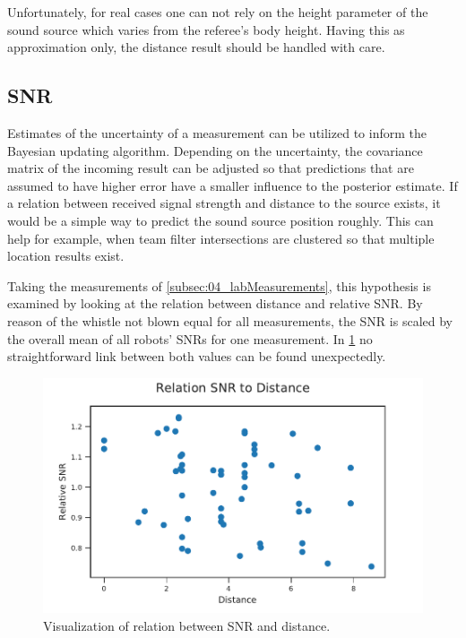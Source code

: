 Unfortunately, for real cases one can not rely on the height parameter of the sound
source which varies from the referee's body height.
Having this as approximation only, the distance result should be handled
with care.

\subsection{SNR}
\label{subsec:04_snr}

Estimates of the uncertainty of a measurement can be utilized to inform the
Bayesian updating algorithm.
Depending on the uncertainty, the covariance matrix of the incoming result can
be adjusted so that predictions that are assumed to have higher error have
a smaller influence to the posterior estimate.
If a relation between received signal strength and distance to the source exists,
it would be a simple way to predict the sound source position roughly.
This can help for example, when team filter intersections are clustered so that
multiple location results exist.

Taking the measurements of \cref{subsec:04_labMeasurements}, this hypothesis is
examined by looking at the relation between distance and relative \ac{SNR}.
By reason of the whistle not blown equal for all measurements,
the \ac{SNR} is scaled by the overall mean of all robots' \acp{SNR} for one
measurement.
In \cref{fig:04_snrDistance} no straightforward
link between both values can be found unexpectedly.
\begin{figure}[ht]
	\centering
	\includegraphics[]{figures/evaluation/snr_scatter}
	\caption{Visualization of relation between SNR and distance.}
	\label{fig:04_snrDistance}
\end{figure}


